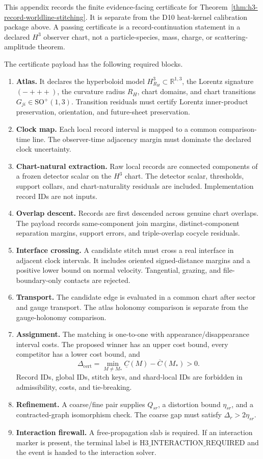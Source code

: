 This appendix records the finite evidence-facing certificate for
Theorem~\ref{thm:h3-record-worldline-stitching}. It is separate from the D10 heat-kernel
calibration package above. A passing certificate is a record-continuation statement in a declared
\(H^3\) observer chart, not a particle-species, mass, charge, or scattering-amplitude theorem.

The certificate payload has the following required blocks.
\begin{enumerate}
\item \textbf{Atlas.} It declares the hyperboloid model \(H^3_{R_H}\subset\mathbb R^{1,3}\),
the Lorentz signature \((-+++)\), the curvature radius \(R_H\), chart domains, and chart
transitions \(G_{ji}\in\mathrm{SO}^{+}(1,3)\). Transition residuals must certify Lorentz
inner-product preservation, orientation, and future-sheet preservation.
\item \textbf{Clock map.} Each local record interval is mapped to a common comparison-time line.
The observer-time adjacency margin must dominate the declared clock uncertainty.
\item \textbf{Chart-natural extraction.} Raw local records are connected components of a frozen
detector scalar on the \(H^3\) chart. The detector scalar, thresholds, support collars, and
chart-naturality residuals are included. Implementation record IDs are not inputs.
\item \textbf{Overlap descent.} Records are first descended across genuine chart overlaps. The
payload records same-component join margins, distinct-component separation margins, support
errors, and triple-overlap cocycle residuals.
\item \textbf{Interface crossing.} A candidate stitch must cross a real interface in adjacent
clock intervals. It includes oriented signed-distance margins and a positive lower bound on
normal velocity. Tangential, grazing, and file-boundary-only contacts are rejected.
\item \textbf{Transport.} The candidate edge is evaluated in a common chart after sector and
gauge transport. The atlas holonomy comparison is separate from the gauge-holonomy comparison.
\item \textbf{Assignment.} The matching is one-to-one with appearance/disappearance interval
costs. The proposed winner has an upper cost bound, every competitor has a lower cost bound, and
\[
\Delta_{\mathrm{cert}}
=\min_{M\ne M_*}\underline C(M)-\overline C(M_*)>0 .
\]
Record IDs, global IDs, stitch keys, and shard-local IDs are forbidden in admissibility, costs,
and tie-breaking.
\item \textbf{Refinement.} A coarse/fine pair supplies \(Q_{sr}\), a distortion bound
\(\eta_{sr}\), and a contracted-graph isomorphism check. The coarse gap must satisfy
\(\Delta_r>2\eta_{sr}\).
\item \textbf{Interaction firewall.} A free-propagation slab is required. If an interaction marker
is present, the terminal label is \(\mathrm{H3\_INTERACTION\_REQUIRED}\) and the event is handed
to the interaction solver.
\end{enumerate}

